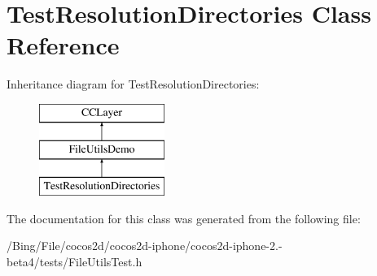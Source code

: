 \hypertarget{interface_test_resolution_directories}{\section{Test\-Resolution\-Directories Class Reference}
\label{interface_test_resolution_directories}
}
Inheritance diagram for Test\-Resolution\-Directories\-:\begin{figure}[H]
\begin{center}
\leavevmode
\includegraphics[height=3.000000cm]{interface_test_resolution_directories}
\end{center}
\end{figure}


The documentation for this class was generated from the following file\-:\begin{DoxyCompactItemize}
\item 
/\-Bing/\-File/cocos2d/cocos2d-\/iphone/cocos2d-\/iphone-\/2.-\/beta4/tests/File\-Utils\-Test.\-h\end{DoxyCompactItemize}
